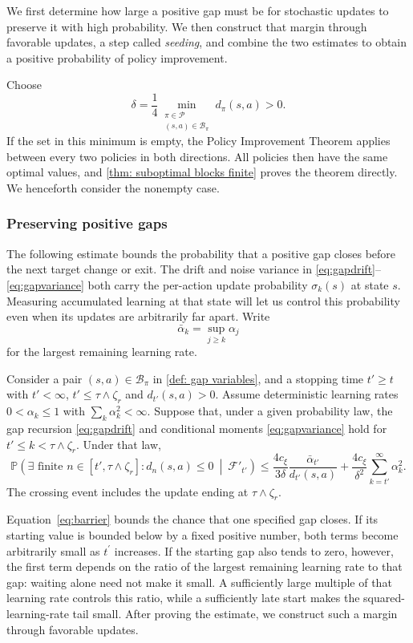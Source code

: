 We first determine how large a positive gap must be for stochastic updates to preserve it with high probability. We then construct that margin through favorable updates, a step called \emph{seeding}, and combine the two estimates to obtain a positive probability of policy improvement.

Choose
\begin{equation}
\label{eq:constants}
\delta=\frac14\min_{\substack{\pi\in\mathcal P\\(s,a)\in\mathcal B_\pi}}d_\pi(s,a)>0.
\end{equation}
If the set in this minimum is empty, the Policy Improvement Theorem applies between every two policies in both directions. All policies then have the same optimal values, and \autoref{thm: suboptimal blocks finite} proves the theorem directly. We henceforth consider the nonempty case.

\subsubsection{Preserving positive gaps}
The following estimate bounds the probability that a positive gap closes before the next target change or exit. The drift and noise variance in \eqref{eq:gapdrift}--\eqref{eq:gapvariance} both carry the per-action update probability $\sigma_k(s)$ at state $s$. Measuring accumulated learning at that state will let us control this probability even when its updates are arbitrarily far apart. Write
\[
\bar\alpha_k=\sup_{j\ge k}\alpha_j
\]
for the largest remaining learning rate.

\begin{lemma}
\label{lem:barrier}
Consider a pair $(s,a)\in\mathcal B_\pi$ in \autoref{def: gap variables}, and a stopping time $t'\ge t$ with $t'<\infty$, $t'\le\tau\wedge\zeta_r$ and $d_{t'}(s,a)>0$.
Assume deterministic learning rates $0<\alpha_k\le1$ with $\sum_k\alpha_k^2<\infty$. Suppose that, under a given probability law, the gap recursion \eqref{eq:gapdrift} and conditional moments \eqref{eq:gapvariance} hold for $t'\le k<\tau\wedge\zeta_r$. Under that law,
\begin{equation}
\label{eq:barrier}
\mathbb P\!\left(\exists\text{ finite }n\in[t',\tau\wedge\zeta_r]:d_n(s,a)\le0\ \middle|\ \mathcal F'_{t'}\right)
\le \frac{4c_\xi}{3\delta}\frac{\bar\alpha_{t'}}{d_{t'}(s,a)}
+\frac{4c_\xi}{\delta^2}\sum_{k=t'}^\infty\alpha_k^2.
\end{equation}
The crossing event includes the update ending at $\tau\wedge\zeta_r$.
\end{lemma}
Equation~\eqref{eq:barrier} bounds the chance that one specified gap closes. If its starting value is bounded below by a fixed positive number, both terms become arbitrarily small as $t^{\prime}$ increases. If the starting gap also tends to zero, however, the first term depends on the ratio of the largest remaining learning rate to that gap: waiting alone need not make it small. A sufficiently large multiple of that learning rate controls this ratio, while a sufficiently late start makes the squared-learning-rate tail small. After proving the estimate, we construct such a margin through favorable updates.

